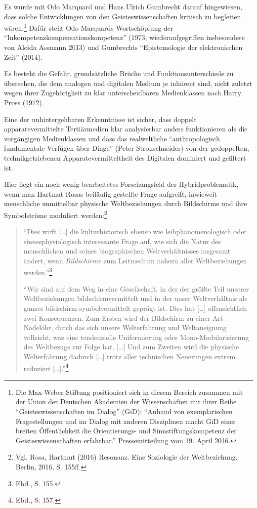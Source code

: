 \documentclass[a4paper,
fontsize=11pt,
oneside,
numbers=noperiodatend,
parskip=half-,
bibliography=totoc,
final
]{scrartcl}
\begin{document}
Es wurde mit Odo Marquard und Hans Ulrich Gumbrecht darauf hingewiesen,
dass solche Entwicklungen von den Geisteswissenschaften kritisch zu
begleiten wären.\footnote{Die Max-Weber-Stiftung positioniert sich in
  diesem Bereich zusammen mit der Union der Deutschen Akademien der
  Wissenschaften mit ihrer Reihe \enquote{Geisteswissenschaften im
  Dialog} (GiD): \enquote{Anhand von exemplarischen Fragestellungen und
  im Dialog mit anderen Disziplinen macht GiD einer breiten
  Öffentlichkeit die Orientierungs- und Sinnstiftungskompetenz der
  Geisteswissenschaften erfahrbar.} Pressemitteilung vom 19. April 2016.}
Dafür steht Odo Marquards Wortschöpfung der
\enquote{Inkompetenzkompensationskompetenz} (1973, wiederaufgegriffen
insbesondere von Aleida Assmann 2013) und Gumbrechts
\enquote{Epistemologie der elektronischen Zeit} (2014).

Es besteht die Gefahr, grundsätzliche Brüche und Funktionsunterschiede
zu übersehen, die dem analogen und digitalen Medium je inhärent sind,
nicht zuletzt wegen ihrer Zugehörigkeit zu klar unterscheidbaren
Medienklassen nach Harry Pross (1972).

Eine der unhintergehbaren Erkenntnisse ist sicher, dass doppelt
apparatevermittelte Tertiärmedien klar analysierbar anders funktionieren
als die vorgängigen Medienklassen und dass das realweltliche
\enquote{anthropologisch fundamentale Verfügen über Dinge} (Peter
Strohschneider) von der gedoppelten, technikgetriebenen
Apparatevermitteltheit des Digitalen dominiert und gefiltert ist.

Hier liegt ein noch wenig bearbeitetes Forschungsfeld der
Hybridproblematik, wenn man Hartmut Rosas beiläufig gestellte Frage
aufgreift, inwieweit menschliche unmittelbar physische Weltbeziehungen
durch Bildschirme und ihre Symbolströme moduliert werden:\footnote{Vgl.
  Rosa, Hartmut (2016) Resonanz. Eine Soziologie der Weltbeziehung.
  Berlin, 2016, S. 155ff.}

\begin{quote}
\enquote{Dies wirft {[}\ldots{}{]} die kulturhistorisch ebenso wie
leibphänomenologisch oder sinnesphysiologisch interessante Frage auf,
wie sich die Natur des menschlichen und seines biographischen
Weltverhältnisses insgesamt ändert, wenn \emph{Bildschirme} zum
Leitmedium nahezu aller Weltbeziehungen werden.}\footnote{Ebd., S. 155.}

\enquote{Wir sind auf dem Weg in eine Gesellschaft, in der der größte
Teil unserer Weltbeziehungen bildschirmvermittelt und in der unser
Weltverhältnis als ganzes bildschirm-symbolvermittelt geprägt ist. Dies
hat {[}\ldots{}{]} offensichtlich zwei Konsequenzen. Zum Ersten wird der
Bildschirm zu einer Art Nadelöhr, durch das sich unsere Welterfahrung
und Weltaneignung vollzieht, was eine tendenzielle Uniformierung oder
Mono-Modularisierung des Weltbezugs zur Folge hat. {[}\ldots{}{]} Und
zum Zweiten wird die physische Welterfahrung dadurch {[}\ldots{}{]}
trotz aller technischen Neuerungen extrem reduziert
{[}\ldots{}{]}.}\footnote{Ebd., S. 157.}
\end{quote}
\end{document}
